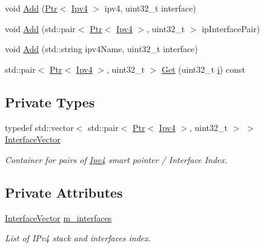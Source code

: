 \begin{DoxyCompactItemize}
void \hyperlink{classns3_1_1Ipv4InterfaceContainer_a9e52fccf4def47d4fcaa40d368a560c7}{Add} (\hyperlink{classns3_1_1Ptr}{Ptr}$<$ \hyperlink{classns3_1_1Ipv4}{Ipv4} $>$ ipv4, uint32\+\_\+t interface)
\item 
void \hyperlink{classns3_1_1Ipv4InterfaceContainer_ab19c6d1666a08c6804f4534a2f1d3343}{Add} (std\+::pair$<$ \hyperlink{classns3_1_1Ptr}{Ptr}$<$ \hyperlink{classns3_1_1Ipv4}{Ipv4} $>$, uint32\+\_\+t $>$ ip\+Interface\+Pair)
\item 
void \hyperlink{classns3_1_1Ipv4InterfaceContainer_a4102276d0f31b9ad4dd38a43cc88b5dc}{Add} (std\+::string ipv4\+Name, uint32\+\_\+t interface)
\item 
std\+::pair$<$ \hyperlink{classns3_1_1Ptr}{Ptr}$<$ \hyperlink{classns3_1_1Ipv4}{Ipv4} $>$, uint32\+\_\+t $>$ \hyperlink{classns3_1_1Ipv4InterfaceContainer_a6528d70874071a882a3f5068c12dd9ad}{Get} (uint32\+\_\+t \hyperlink{lte__uplink__power__control_8m_a6f6ccfcf58b31cb6412107d9d5281426}{i}) const 
\end{DoxyCompactItemize}
\subsection*{Private Types}
\begin{DoxyCompactItemize}
\item 
typedef std\+::vector$<$ std\+::pair$<$ \hyperlink{classns3_1_1Ptr}{Ptr}$<$ \hyperlink{classns3_1_1Ipv4}{Ipv4} $>$, uint32\+\_\+t $>$ $>$ \hyperlink{classns3_1_1Ipv4InterfaceContainer_aa8ccc14e1294bb6d73b9feb7546dc0bc}{Interface\+Vector}
\begin{DoxyCompactList}\small\item\em Container for pairs of \hyperlink{classns3_1_1Ipv4}{Ipv4} smart pointer / Interface Index. \end{DoxyCompactList}\end{DoxyCompactItemize}
\subsection*{Private Attributes}
\begin{DoxyCompactItemize}
\item 
\hyperlink{classns3_1_1Ipv4InterfaceContainer_aa8ccc14e1294bb6d73b9feb7546dc0bc}{Interface\+Vector} \hyperlink{classns3_1_1Ipv4InterfaceContainer_ad24e1d0f593229265cf2a27a06c16329}{m\+\_\+interfaces}
\begin{DoxyCompactList}\small\item\em List of I\+Pv4 stack and interfaces index. \end{DoxyCompactList}\end{DoxyCompactItemize}


